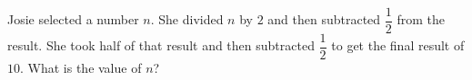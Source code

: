 Josie selected a number $n$. She divided $n$ by $2$ and then subtracted $\dfrac{1}{2}$ from the result. She took half of that result and then subtracted $\dfrac{1}{2}$ to get the final result of $10$. What is the value of $n$?
